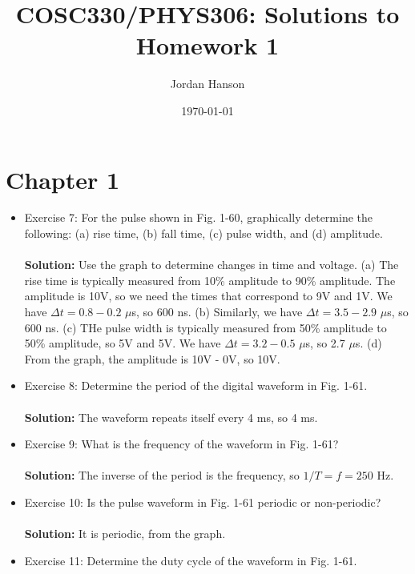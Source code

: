 \documentclass{article}
\title{COSC330/PHYS306: Solutions to Homework 1}
\author{Jordan Hanson}
\date{\today}
\begin{document}
\maketitle

\section{Chapter 1}

\begin{itemize}
    \item Exercise 7: For the pulse shown in Fig. 1-60, graphically determine the following: (a) rise time, (b) fall time, (c) pulse width, and (d) amplitude. \\ \\
    \noindent
    \textbf{Solution:} Use the graph to determine changes in time and voltage.  (a) The rise time is typically measured from 10\% amplitude to 90\% amplitude.  The amplitude is 10V, so we need the times that correspond to 9V and 1V.  We have $\Delta t = 0.8 - 0.2$ $\mu$s, so 600 ns. (b) Similarly, we have $\Delta t = 3.5 - 2.9$ $\mu$s, so 600 ns.  (c) THe pulse width is typically measured from 50\% amplitude to 50\% amplitude, so 5V and 5V.  We have $\Delta t = 3.2 - 0.5$ $\mu$s, so 2.7 $\mu$s. (d) From the graph, the amplitude is 10V - 0V, so 10V. \\
    \item Exercise 8: Determine the period of the digital waveform in Fig. 1-61. \\ \\
    \noindent
    \textbf{Solution:} The waveform repeats itself every 4 ms, so 4 ms. \\
    \item Exercise 9: What is the frequency of the waveform in Fig. 1-61? \\ \\
    \noindent
    \textbf{Solution:} The inverse of the period is the frequency, so $1/T = f = 250$ Hz. \\
    \item Exercise 10: Is the pulse waveform in Fig. 1-61 periodic or non-periodic? \\ \\
    \noindent
    \textbf{Solution:} It is periodic, from the graph. \\
    \item Exercise 11: Determine the duty cycle of the waveform in Fig. 1-61. \\ \\
    \noindent

\end{itemize}
\end{document}
